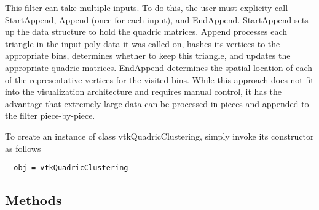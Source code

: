  This filter can take multiple inputs.  To do this, the user must explicity
 call StartAppend, Append (once for each input), and EndAppend.  StartAppend
 sets up the data structure to hold the quadric matrices.  Append processes
 each triangle in the input poly data it was called on, hashes its vertices
 to the appropriate bins, determines whether to keep this triangle, and
 updates the appropriate quadric matrices.  EndAppend determines the spatial
 location of each of the representative vertices for the visited bins. While
 this approach does not fit into the visualization architecture and requires
 manual control, it has the advantage that extremely large data can be 
 processed in pieces and appended to the filter piece-by-piece.

To create an instance of class vtkQuadricClustering, simply
invoke its constructor as follows
\begin{verbatim}
  obj = vtkQuadricClustering
\end{verbatim}
\subsection{Methods}


